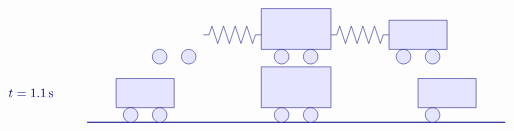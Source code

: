 \begin{solution}
\begin{itemize}
\begin{equation*}
\begin{tikzpicture}[scale=0.8, color=blue!50!black]
\begin{scope}[yshift=0cm]
\begin{scope}[xshift=0cm]
            \draw[fill=blue!10] (2.5,0.25) circle (0.25);
            \draw[fill=blue!10] (3.5,0.25) circle (0.25);
          \end{scope}
          \begin{scope}[xshift=4.2cm]
            \draw[fill=blue!10] (1.8,0.5) rectangle (4.2,1.9);
            \draw[fill=blue!10] (2.5,0.25) circle (0.25);
            \draw[fill=blue!10] (3.5,0.25) circle (0.25);
          \end{scope}
          \begin{scope}[xshift=8.4cm]
            \draw[fill=blue!10] (2,0.5) rectangle (4,1.5);
            \draw[fill=blue!10] (2.5,0.25) circle (0.25);
            \draw[fill=blue!10] (3.5,0.25) circle (0.25);
          \end{scope}
          \begin{scope}[xshift=4cm]
            \draw (0,1) -- ++(0.2,0) -- ++(0.1,0.3)
            -- ++(0.2,-0.6) -- ++(0.2,0.6)
            -- ++(0.2,-0.6) -- ++(0.2,0.6)
            -- ++(0.2,-0.6) -- ++(0.2,0.6)
            -- ++(0.2,-0.6) -- ++(0.1,0.3)
            -- ++(0.2,0);
          \end{scope}
          \begin{scope}[xshift=8.4cm]
            \draw (0,1) -- ++(0.2,0) -- ++(0.1,0.3)
            -- ++(0.2,-0.6) -- ++(0.2,0.6)
            -- ++(0.2,-0.6) -- ++(0.2,0.6)
            -- ++(0.2,-0.6) -- ++(0.2,0.6)
            -- ++(0.2,-0.6) -- ++(0.1,0.3)
            -- ++(0.2,0);
          \end{scope}
        \end{scope}
        \begin{scope}[yshift=-2cm]
          \draw (-1,1) node[left] {$t=1.1\s$};
          \draw[thick] (0,0) -- (14.4,0);
          \begin{scope}[xshift=-1cm]
            \draw[fill=blue!10] (2,0.5) rectangle (4,1.5);
            \draw[fill=blue!10] (2.5,0.25) circle (0.25);
            \draw[fill=blue!10] (3.5,0.25) circle (0.25);
          \end{scope}
          \begin{scope}[xshift=4.2cm]
            \draw[fill=blue!10] (1.8,0.5) rectangle (4.2,1.9);
            \draw[fill=blue!10] (2.5,0.25) circle (0.25);
            \draw[fill=blue!10] (3.5,0.25) circle (0.25);
          \end{scope}
          \begin{scope}[xshift=9.4cm]
            \draw[fill=blue!10] (2,0.5) rectangle (4,1.5);
            \draw[fill=blue!10] (2.5,0.25) circle (0.25);

\end{scope}
\end{scope}
\end{tikzpicture}
\end{equation*}
\end{itemize}
\end{solution}
